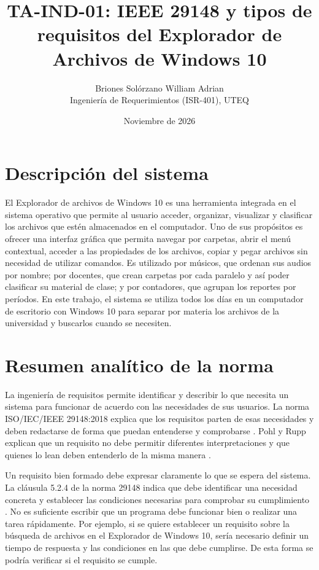 \documentclass[10pt,a4paper]{article}
\title{TA-IND-01: IEEE 29148 y tipos de requisitos del Explorador de Archivos de Windows 10}
\author{Briones Solórzano William Adrian\\
Ingeniería de Requerimientos (ISR-401), UTEQ}
\date{Noviembre de 2026}
\begin{document}
\maketitle
\vspace{-2em}

\section{Descripción del sistema}

El Explorador de archivos de Windows 10 es una herramienta integrada en el sistema operativo que permite al usuario acceder, organizar, visualizar y clasificar los archivos que estén almacenados en el computador. Uno de sus propósitos es ofrecer una interfaz gráfica que permita navegar por carpetas, abrir el menú contextual, acceder a las propiedades de los archivos, copiar y pegar archivos sin necesidad de utilizar comandos. Es utilizado por músicos, que ordenan sus audios por nombre; por docentes, que crean carpetas por cada paralelo y así poder clasificar su material de clase; y por contadores, que agrupan los reportes por períodos. En este trabajo, el sistema se utiliza todos los días en un computador de escritorio con Windows 10 para separar por materia los archivos de la universidad y buscarlos cuando se necesiten.

\section{Resumen analítico de la norma}

La ingeniería de requisitos permite identificar y describir lo que necesita un sistema para funcionar de acuerdo con las necesidades de sus usuarios. La norma ISO/IEC/IEEE 29148:2018 explica que los requisitos parten de esas necesidades y deben redactarse de forma que puedan entenderse y comprobarse \cite[Cl.\ 5.2.3]{iso29148}. Pohl y Rupp explican que un requisito no debe permitir diferentes interpretaciones y que quienes lo lean deben entenderlo de la misma manera \cite[Sec.\ 4.6]{pohl2015}.

Un requisito bien formado debe expresar claramente lo que se espera del sistema. La cláusula 5.2.4 de la norma 29148 indica que debe identificar una necesidad concreta y establecer las condiciones necesarias para comprobar su cumplimiento \cite[Cl.\ 5.2.4]{iso29148}. No es suficiente escribir que un programa debe funcionar bien o realizar una tarea rápidamente. Por ejemplo, si se quiere establecer un requisito sobre la búsqueda de archivos en el Explorador de Windows 10, sería necesario definir un tiempo de respuesta y las condiciones en las que debe cumplirse. De esta forma se podría verificar si el requisito se cumple.
\end{document}
